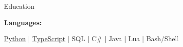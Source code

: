 \documentclass{resume/resume}
\begin{document}
\begin{rSection}{Education}
\begin{adjustwidth}{6em}{0pt}
\end{adjustwidth}

\end{rSection}

%
%   
%
%
%
\vspace{-0.4em}
{\bf Languages:}
\vspace{-1.83em}
\begin{adjustwidth}{6em}{0pt}
  \href{https://github.com/search?q=user\%3ASpelkington+user\%3AUtahTriangle+extension\%3Apy+extension\%3Aipynb&type=Code&ref=advsearch&l=&l=}{Python} |
  \href{https://github.com/search?p=1&q=user\%3ASpelkington+extension\%3Ats+extension\%3Atsx&type=Code}{TypeScript} | 
  SQL |
  C\# |
  Java |
  Lua | 
  Bash/Shell
\end{adjustwidth}
\end{document}
